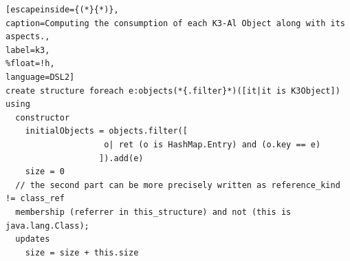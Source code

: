 \begin{lstlisting}[escapeinside={(*}{*)},
caption=Computing the consumption of each K3-Al Object along with its aspects., 
label=k3,
%float=!h, 
language=DSL2]
create structure foreach e:objects(*{.filter}*)([it|it is K3Object]) using
  constructor
    initialObjects = objects.filter([
				    o| ret (o is HashMap.Entry) and (o.key == e)
				   ]).add(e)
    size = 0
  // the second part can be more precisely written as reference_kind != class_ref
  membership (referrer in this_structure) and not (this is java.lang.Class);
  updates
    size = size + this.size
\end{lstlisting}